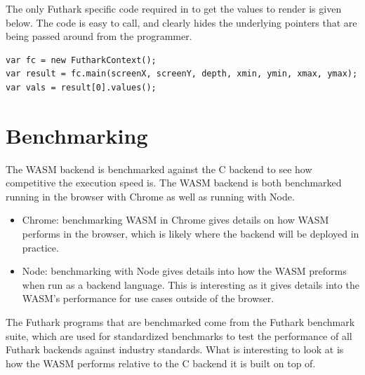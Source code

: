 \documentclass[11pt]{book}
\begin{document}
The only Futhark specific code required in to get the values to render is given below. The code is easy to call, and clearly hides the underlying pointers that are being passed around from the programmer.

\begin{verbatim}
var fc = new FutharkContext();
var result = fc.main(screenX, screenY, depth, xmin, ymin, xmax, ymax);
var vals = result[0].values();
\end{verbatim}

\section{Benchmarking}

The WASM backend is benchmarked against the C backend to see how competitive the execution speed is. The WASM backend is both benchmarked running in the browser with Chrome as well as running with Node. 
\begin{itemize}
    \item Chrome: benchmarking WASM in Chrome gives details on how WASM performs in the browser, which is likely where the backend will be deployed in practice.
    \item Node: benchmarking with Node gives details into how the WASM preforms when run as a backend language. This is interesting as it gives details into the WASM's performance for use cases outside of the browser.
\end{itemize}



The Futhark programs that are benchmarked come from the Futhark benchmark suite, which are used for standardized benchmarks to test the performance of all Futhark backends against industry standards. What is interesting to look at is how the WASM performs relative to the C backend it is built on top of.
\begin{table}[h!]
    \noindent{}
    \caption{Caption}
    \label{tab:my_label}
\end{table}
\end{document}
